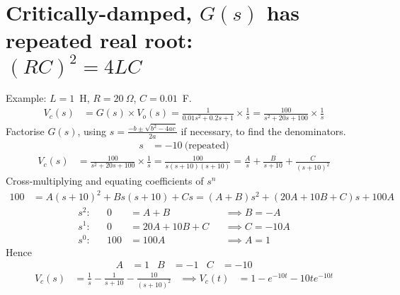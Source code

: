 \documentclass[a4paper,12pt]{article}
\begin{document}
\newpage
\section*{Critically-damped, $G(s)$ has repeated real root:\\$(RC)^2=4LC $}
Example: $L=1$~H, $R=20~\Omega$, $C=0.01$~F. %
\begin{align*}
  V_c(s) &= G(s) \times V_o(s)
  = \frac{1}{0.01 s^2 + 0.2 s + 1} \times \frac{1}{s}
  = \frac{100}{s^2 + 20 s + 100} \times \frac{1}{s}
\end{align*}
Factorise $G(s)$, using $s = \frac{-b\pm\sqrt{b^2-4ac}}{2a}$ if necessary, to find the denominators.
\begin{align*}
  s &= -10~\text{(repeated)}
\end{align*}
\begin{align*}
  V_c(s) &= \frac{100}{s^2 + 20 s + 100} \times \frac{1}{s}
  = \frac{100}{s(s+10)(s+10)}
  = \frac{A}{s} + \frac{B}{s+10} + \frac{C}{(s+10)^2}
\end{align*}
Cross-multiplying and equating coefficients of $s^n$
\begin{align*}
  100 &= A(s+10)^2 + Bs(s+10) + Cs = (A+B)s^2 + (20A+10B+C)s + 100A
\end{align*}
\begin{align*}
  s^2: && 0 &= A+B  &&\implies B = -A\\
  s^1: && 0 &= 20A+10B+C &&\implies C = -10A\\
  s^0: && 100 &= 100 A && \implies A = 1
\end{align*}
Hence
\begin{align*}
  A &= 1 & B &= -1 & C &= -10
\end{align*}
\begin{align*}
  V_c(s) &= \frac{1}{s} - \frac{1}{s+10} - \frac{10}{(s+10)^2} &\implies
  V_c(t) &= 1 - e^{-10t} -10te^{-10t}
\end{align*}
\newpage
\end{document}

